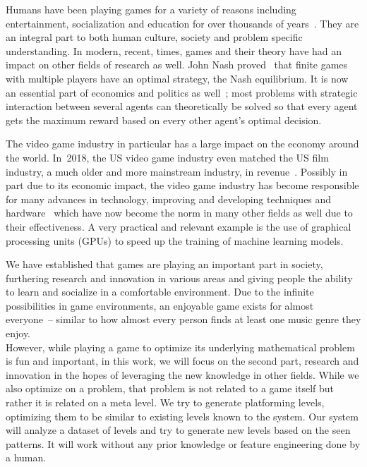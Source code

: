 Humans have been playing games for a variety of reasons including
entertainment, socialization and education for over thousands of
years~\cite{HistoryGames2019}. They are an integral part to both human
culture, society and problem specific understanding. In modern,
recent, times, games and their theory have had an impact on other
fields of research as well. John Nash
proved~\cite{NashEquilibrium2019} that finite games with multiple
players have an optimal strategy, the Nash equilibrium. It is now an
essential part of economics and politics as
well~\cite{NashEquilibrium2019}; most problems with strategic
interaction between several agents can theoretically be solved so that
every agent gets the maximum reward based on every other agent's
optimal decision.

The video game industry in particular has a large impact on the
economy around the world. In~2018, the US video game industry even
matched the US film industry, a much older and more mainstream
industry, in revenue~\cite{VideoGameIndustry2019}. Possibly in part
due to its economic impact, the video game industry has become
responsible for many advances in technology, improving and developing
techniques and hardware~\cite{VideoGameIndustry2019} which have now
become the norm in many other fields as well due to their
effectiveness. A very practical and relevant example is the use of
graphical processing units (GPUs) to speed up the training of machine
learning models.

We have established that games are playing an important part in
society, furthering research and innovation in various areas and
giving people the ability to learn and socialize in a comfortable
environment. Due to the infinite possibilities in game environments,
an enjoyable game exists for almost everyone~-- similar to how almost
every person finds at least one music genre they enjoy. \\
However, while playing a game to optimize its underlying mathematical
problem is fun and important, in this work, we will focus on the
second part, research and innovation in the hopes of leveraging the
new knowledge in other fields. While we also optimize on a problem,
that problem is not related to a game itself but rather it is related
on a meta level. We try to generate platforming levels, optimizing
them to be similar to existing levels known to the system. Our system
will analyze a dataset of levels and try to generate new levels based
on the seen patterns. It will work without any prior knowledge or
feature engineering done by a human.


